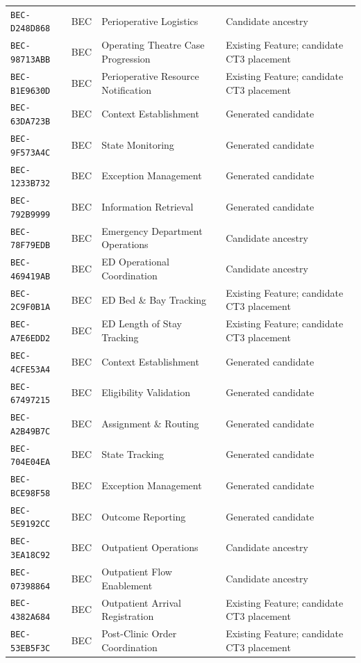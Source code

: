 \documentclass[11pt,a4paper,openany]{book}
\begin{document}
\begin{longtable}{@{}p{.19\linewidth}p{.12\linewidth}p{.39\linewidth}p{.24\linewidth}@{}}
\texttt{BEC-D248D868} & BEC & Perioperative Logistics & Candidate ancestry \\
\texttt{BEC-98713ABB} & BEC & Operating Theatre Case Progression & Existing Feature; candidate CT3 placement \\
\texttt{BEC-B1E9630D} & BEC & Perioperative Resource Notification & Existing Feature; candidate CT3 placement \\
\texttt{BEC-63DA723B} & BEC & Context Establishment & Generated candidate \\
\texttt{BEC-9F573A4C} & BEC & State Monitoring & Generated candidate \\
\texttt{BEC-1233B732} & BEC & Exception Management & Generated candidate \\
\texttt{BEC-792B9999} & BEC & Information Retrieval & Generated candidate \\
\texttt{BEC-78F79EDB} & BEC & Emergency Department Operations & Candidate ancestry \\
\texttt{BEC-469419AB} & BEC & ED Operational Coordination & Candidate ancestry \\
\texttt{BEC-2C9F0B1A} & BEC & ED Bed \& Bay Tracking & Existing Feature; candidate CT3 placement \\
\texttt{BEC-A7E6EDD2} & BEC & ED Length of Stay Tracking & Existing Feature; candidate CT3 placement \\
\texttt{BEC-4CFE53A4} & BEC & Context Establishment & Generated candidate \\
\texttt{BEC-67497215} & BEC & Eligibility Validation & Generated candidate \\
\texttt{BEC-A2B49B7C} & BEC & Assignment \& Routing & Generated candidate \\
\texttt{BEC-704E04EA} & BEC & State Tracking & Generated candidate \\
\texttt{BEC-BCE98F58} & BEC & Exception Management & Generated candidate \\
\texttt{BEC-5E9192CC} & BEC & Outcome Reporting & Generated candidate \\
\texttt{BEC-3EA18C92} & BEC & Outpatient Operations & Candidate ancestry \\
\texttt{BEC-07398864} & BEC & Outpatient Flow Enablement & Candidate ancestry \\
\texttt{BEC-4382A684} & BEC & Outpatient Arrival Registration & Existing Feature; candidate CT3 placement \\
\texttt{BEC-53EB5F3C} & BEC & Post-Clinic Order Coordination & Existing Feature; candidate CT3 placement \\

\end{longtable}
\end{document}
